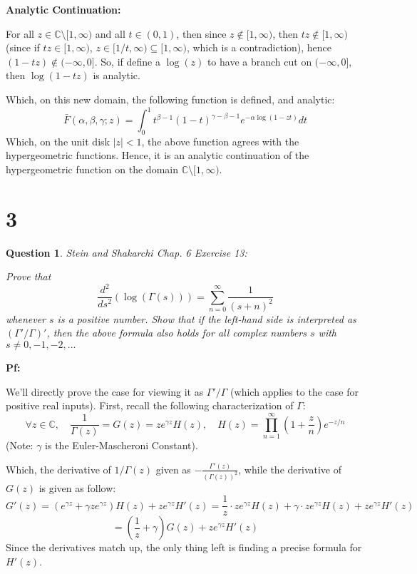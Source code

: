 \documentclass{article}
\newtheorem{question}{Question}
\begin{document}
\hfil

\textbf{Analytic Continuation:}

For all $z\in\mathbb{C}\setminus[1,\infty)$ and all $t\in (0,1)$, then since $z\notin [1,\infty)$, then $tz\notin [1,\infty)$ (since if $tz\in [1,\infty)$, $z\in [1/t,\infty)\subseteq [1,\infty)$, which is a contradiction), hence $(1-tz)\notin (-\infty,0]$.
So, if define a $\log(z)$ to have a branch cut on $(-\infty,0]$, then $\log(1-tz)$ is analytic.

Which, on this new domain, the following function is defined, and analytic:
$$\bar{F}(\alpha,\beta,\gamma;z)=\int_{0}^{1}t^{\beta-1}(1-t)^{\gamma-\beta-1}e^{-\alpha\log(1-zt)}dt$$
Which, on the unit disk $|z|<1$, the above function agrees with the hypergeometric functions. Hence, it is an analytic continuation of the hypergeometric function on the domain $\mathbb{C}\setminus[1,\infty)$.

\break

\section*{3}
\begin{myBox}[]{}
    \begin{question}
        Stein and Shakarchi Chap. 6 Exercise 13:

        Prove that
        $$\frac{d^2}{ds^2}(\log(\Gamma(s)))=\sum_{n=0}^{\infty}\frac{1}{(s+n)^2}$$
        whenever $s$ is a positive number. Show that if the left-hand side is interpreted
        as $(\Gamma'/\Gamma)'$, then the above formula also holds for all complex numbers $s$ with
        $s\neq 0,-1,-2,...$
    \end{question}
\end{myBox}

\textbf{Pf:}

We'll directly prove the case for viewing it as $\Gamma'/\Gamma$ (which applies to the case for positive real inputs).
First, recall the following characterization of $\Gamma$:
$$\forall z\in\mathbb{C},\quad \frac{1}{\Gamma(z)}=G(z)=ze^{\gamma z}H(z),\quad H(z)=\prod_{n=1}^{\infty}\left(1+\frac{z}{n}\right)e^{-z/n}$$
(Note: $\gamma$ is the Euler-Mascheroni Constant).

Which, the derivative of $1/\Gamma(z)$ given as $-\frac{\Gamma'(z)}{(\Gamma(z))^2}$, while the derivative of $G(z)$ is given as follow:
$$G'(z)=\left(e^{\gamma z}+\gamma ze^{\gamma z}\right)H(z)+ze^{\gamma z}H'(z) = \frac{1}{z}\cdot ze^{\gamma z}H(z)+\gamma\cdot ze^{\gamma z}H(z)+ze^{\gamma z}H'(z)$$
$$ = \left(\frac{1}{z}+\gamma\right)G(z)+ze^{\gamma z}H'(z)$$
Since the derivatives match up, the only thing left is finding a precise formula for $H'(z)$.
\end{document}
